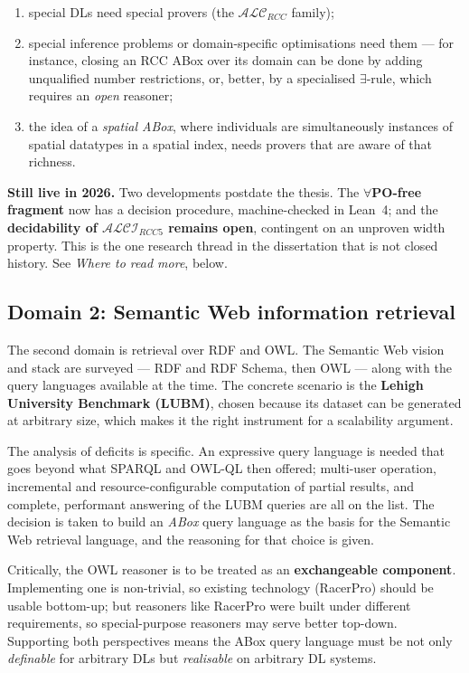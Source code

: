\documentclass[11pt,a4paper,DIV=12,parskip=half]{scrartcl}
\newenvironment{note}
  {\begin{list}{}{\setlength{\leftmargin}{1.5em}\setlength{\rightmargin}{1.5em}%
                  \setlength{\listparindent}{0pt}}\item[]\small}
  {\end{list}}
\begin{document}
\begin{enumerate}
\item special DLs need special provers (the $\mathcal{ALC}_{RCC}$ family);
\item special inference problems or domain-specific optimisations need them ---
  for instance, closing an RCC ABox over its domain can be done by adding
  unqualified number restrictions, or, better, by a specialised $\exists$-rule,
  which requires an \emph{open} reasoner;
\item the idea of a \emph{spatial ABox}, where individuals are simultaneously
  instances of spatial datatypes in a spatial index, needs provers that are
  aware of that richness.
\end{enumerate}

\begin{note}
\textbf{Still live in 2026.} Two developments postdate the thesis. The
\textbf{$\forall$PO-free fragment} now has a decision procedure, machine-checked
in Lean~4; and the \textbf{decidability of $\mathcal{ALCI}_{RCC5}$ remains
open}, contingent on an unproven width property. This is the one research thread
in the dissertation that is not closed history. See \emph{Where to read more},
below.
\end{note}

\subsection{Domain 2: Semantic Web information retrieval}

The second domain is retrieval over RDF and OWL. The Semantic Web vision and
stack are surveyed --- RDF and RDF Schema, then OWL --- along with the query
languages available at the time. The concrete scenario is the \textbf{Lehigh
University Benchmark (LUBM)}, chosen because its dataset can be generated at
arbitrary size, which makes it the right instrument for a scalability argument.

The analysis of deficits is specific. An expressive query language is needed
that goes beyond what SPARQL and OWL-QL then offered; multi-user operation,
incremental and resource-configurable computation of partial results, and
complete, performant answering of the LUBM queries are all on the list. The
decision is taken to build an \emph{ABox} query language as the basis for the
Semantic Web retrieval language, and the reasoning for that choice is given.

Critically, the OWL reasoner is to be treated as an \textbf{exchangeable
component}. Implementing one is non-trivial, so existing technology (RacerPro)
should be usable bottom-up; but reasoners like RacerPro were built under
different requirements, so special-purpose reasoners may serve better top-down.
Supporting both perspectives means the ABox query language must be not only
\emph{definable} for arbitrary DLs but \emph{realisable} on arbitrary DL systems.
\end{document}
